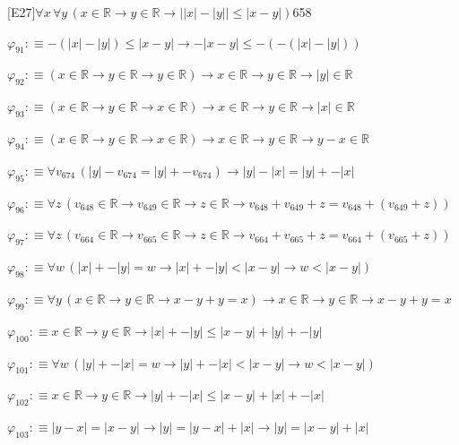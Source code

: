 \begin{fullproof}{[E27]}{$\forall x\,\forall y\,(x \in \mathbb{R} \to y \in \mathbb{R} \to \lvert \lvert x \rvert - \lvert y \rvert \rvert \leq \lvert x - y \rvert)$}{658}
\begin{abbrevlist}
\item $\varphi_{91} :\equiv -(\lvert x \rvert - \lvert y \rvert) \leq \lvert x - y \rvert \to -\lvert x - y \rvert \leq -(-(\lvert x \rvert - \lvert y \rvert))$
\item $\varphi_{92} :\equiv (x \in \mathbb{R} \to y \in \mathbb{R} \to y \in \mathbb{R}) \to x \in \mathbb{R} \to y \in \mathbb{R} \to \lvert y \rvert \in \mathbb{R}$
\item $\varphi_{93} :\equiv (x \in \mathbb{R} \to y \in \mathbb{R} \to x \in \mathbb{R}) \to x \in \mathbb{R} \to y \in \mathbb{R} \to \lvert x \rvert \in \mathbb{R}$
\item $\varphi_{94} :\equiv (x \in \mathbb{R} \to y \in \mathbb{R} \to x \in \mathbb{R}) \to x \in \mathbb{R} \to y \in \mathbb{R} \to y - x \in \mathbb{R}$
\item $\varphi_{95} :\equiv \forall v_{674}\,(\lvert y \rvert - v_{674} = \lvert y \rvert + -v_{674}) \to \lvert y \rvert - \lvert x \rvert = \lvert y \rvert + -\lvert x \rvert$
\item $\varphi_{96} :\equiv \forall z\,(v_{648} \in \mathbb{R} \to v_{649} \in \mathbb{R} \to z \in \mathbb{R} \to v_{648} + v_{649} + z = v_{648} + (v_{649} + z))$
\item $\varphi_{97} :\equiv \forall z\,(v_{664} \in \mathbb{R} \to v_{665} \in \mathbb{R} \to z \in \mathbb{R} \to v_{664} + v_{665} + z = v_{664} + (v_{665} + z))$
\item $\varphi_{98} :\equiv \forall w\,(\lvert x \rvert + -\lvert y \rvert = w \to \lvert x \rvert + -\lvert y \rvert < \lvert x - y \rvert \to w < \lvert x - y \rvert)$
\item $\varphi_{99} :\equiv \forall y\,(x \in \mathbb{R} \to y \in \mathbb{R} \to x - y + y = x) \to x \in \mathbb{R} \to y \in \mathbb{R} \to x - y + y = x$
\item $\varphi_{100} :\equiv x \in \mathbb{R} \to y \in \mathbb{R} \to \lvert x \rvert + -\lvert y \rvert \leq \lvert x - y \rvert + \lvert y \rvert + -\lvert y \rvert$
\item $\varphi_{101} :\equiv \forall w\,(\lvert y \rvert + -\lvert x \rvert = w \to \lvert y \rvert + -\lvert x \rvert < \lvert x - y \rvert \to w < \lvert x - y \rvert)$
\item $\varphi_{102} :\equiv x \in \mathbb{R} \to y \in \mathbb{R} \to \lvert y \rvert + -\lvert x \rvert \leq \lvert x - y \rvert + \lvert x \rvert + -\lvert x \rvert$
\item $\varphi_{103} :\equiv \lvert y - x \rvert = \lvert x - y \rvert \to \lvert y \rvert = \lvert y - x \rvert + \lvert x \rvert \to \lvert y \rvert = \lvert x - y \rvert + \lvert x \rvert$

\end{abbrevlist}
\end{fullproof}
